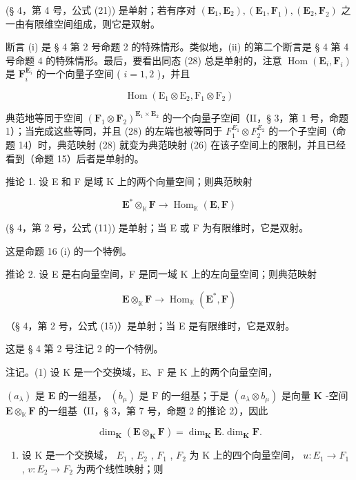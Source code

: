(§ 4，第 4 号，公式 (21)) 是单射；若有序对 \((\mathbf{E}_1, \mathbf{E}_2), (\mathbf{E}_1, \mathbf{F}_1), (\mathbf{E}_2, \mathbf{F}_2)\) 之一由有限维空间组成，则它是双射。

断言 (i) 是 § 4 第 2 号命题 2 的特殊情形。类似地，(ii) 的第二个断言是 § 4 第 4 号命题 4 的特殊情形。最后，要看出同态 (28) 总是单射的，注意 \(\operatorname{Hom}(\mathbf{E}_i, \mathbf{F}_i)\) 是 \(\mathbf{F}_i^{\mathbf{E}_i}\) 的一个向量子空间 ( \(i = 1, 2\) )，并且

\[
\operatorname{Hom} \left(\mathrm{E} _ {1} \otimes \mathrm{E} _ {2}, \mathrm{F} _ {1} \otimes \mathrm{F} _ {2}\right)
\]

典范地等同于空间 \((\mathbf{F}_{1} \otimes \mathbf{F}_{2})^{\mathbf{E}_{1} \times \mathbf{E}_{2}}\) 的一个向量子空间（II，§ 3，第 1 号，命题 1）；当完成这些等同，并且 (28) 的左端也被等同于 \(F_{1}^{E_{1}} \otimes F_{2}^{E_{2}}\) 的一个子空间（命题 14）时，典范映射 (28) 就变为典范映射 (26) 在该子空间上的限制，并且已经看到（命题 15）后者是单射的。

推论 1. 设 E 和 F 是域 K 上的两个向量空间；则典范映射

\[
\mathbf {E} ^ {*} \otimes_ {\mathbb {K}} \mathbf {F} \rightarrow \operatorname{Hom} _ {\mathbb {K}} (\mathbf {E}, \mathbf {F})
\]

(§ 4，第 2 号，公式 (11)) 是单射；当 E 或 F 为有限维时，它是双射。

这是命题 16 (i) 的一个特例。

推论 2. 设 E 是右向量空间，F 是同一域 K 上的左向量空间；则典范映射

\[
\mathbf {E} \otimes_ {\mathbb {K}} \mathbf {F} \rightarrow \operatorname{Hom} _ {\mathbb {K}} (\mathbf {E} ^ {*}, \mathbf {F})\tag{29}
\]

（§ 4，第 2 号，公式 (15)）是单射；当 E 是有限维时，它是双射。

这是 § 4 第 2 号注记 2 的一个特例。

注记。(1) 设 K 是一个交换域，E、F 是 K 上的两个向量空间，

\((a_{\lambda})\) 是 \(\mathbf{E}\) 的一组基， \((b_{\mu})\) 是 \(\mathrm{F}\) 的一组基；于是 \((a_{\lambda} \otimes b_{\mu})\) 是向量 \(\mathbf{K}\) -空间 \(\mathbf{E} \otimes_{\mathbb{K}} \mathbf{F}\) 的一组基（II，§ 3，第 7 号，命题 2 的推论 2），因此

\[
\dim_ {\mathbf {K}} (\mathbf {E} \otimes_ {\mathbf {K}} \mathbf {F}) = \dim_ {\mathbf {K}} \mathbf {E}. \dim_ {\mathbf {K}} \mathbf {F}.\tag{30}
\]

\begin{enumerate}
\def\labelenumi{(\arabic{enumi})}
\setcounter{enumi}{1}
\tightlist
\item
  设 K 是一个交换域， \(E_{1}\) , \(E_{2}\) , \(F_{1}\) , \(F_{2}\) 为 K 上的四个向量空间， \(u: E_{1} \rightarrow F_{1}\) , \(v: E_{2} \rightarrow F_{2}\) 为两个线性映射；则
\end{enumerate}

